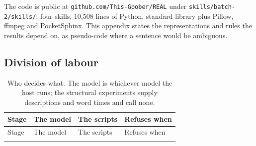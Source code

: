 \documentclass{ceurart}
\begin{document}
The code is public at \texttt{github.com/This-Goober/REAL} under
\texttt{skills/batch-2/skills/}: four skills, 10,508 lines of Python,
standard library plus Pillow, ffmpeg and PocketSphinx. This appendix
states the representations and rules the results depend on, as
pseudo-code where a sentence would be ambiguous.

\subsection{Division of labour}\label{division-of-labour}

\begingroup\small\begin{longtable}[]{@{}
  >{\raggedright\arraybackslash}p{}
  >{\raggedright\arraybackslash}p{}
  >{\raggedright\arraybackslash}p{}
  >{\raggedright\arraybackslash}p{}@{}}
\caption{Who decides what. The model is whichever model the host runs;
the structural experiments supply descriptions and word times and call
none.}\tabularnewline
\toprule\noalign{}
\begin{minipage}[b]{\linewidth}\raggedright
Stage
\end{minipage} & \begin{minipage}[b]{\linewidth}\raggedright
The model
\end{minipage} & \begin{minipage}[b]{\linewidth}\raggedright
The scripts
\end{minipage} & \begin{minipage}[b]{\linewidth}\raggedright
Refuses when
\end{minipage} \\
\midrule\noalign{}
\endfirsthead
\toprule\noalign{}
\begin{minipage}[b]{\linewidth}\raggedright
Stage
\end{minipage} & \begin{minipage}[b]{\linewidth}\raggedright
The model
\end{minipage} & \begin{minipage}[b]{\linewidth}\raggedright
The scripts
\end{minipage} & \begin{minipage}[b]{\linewidth}\raggedright
Refuses when
\end{minipage} \\
\midrule\noalign{}
\endhead
\bottomrule\noalign{}
\endlastfoot

\end{longtable}
\end{document}
